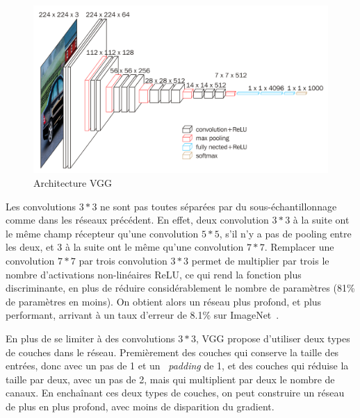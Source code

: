 \begin{figure}%
\includegraphics[width=\columnwidth]{figures/vgg.png}%
\caption{Architecture VGG~\cite{simonyan2014very}}%
\label{fig:vgg}%
\end{figure}

Les convolutions $3*3$ ne sont pas toutes séparées par du sous-échantillonnage comme dans les réseaux précédent.
En effet, deux convolution $3*3$ à la suite ont le même champ récepteur qu'une convolution $5*5$, s'il n'y a pas de pooling entre les deux, et 3 à la suite ont le même qu'une convolution $7*7$.
Remplacer une convolution $7*7$ par trois convolution $3*3$ permet de multiplier par trois le nombre d'activations non-linéaires ReLU, ce qui rend la fonction plus discriminante, en plus de réduire considérablement le nombre de paramètres (81\% de paramètres en moins).
On obtient alors un réseau plus profond, et plus performant, arrivant à un taux d'erreur de 8.1\% sur ImageNet~\cite{simonyan2014very}.

En plus de se limiter à des convolutions $3*3$, VGG propose d'utiliser deux types de couches dans le réseau.
Premièrement des couches qui conserve la taille des entrées, donc avec un pas de 1 et un ~\textit{padding} de 1, et des couches qui réduise la taille par deux, avec un pas de 2, mais qui multiplient par deux le nombre de canaux.
En enchaînant ces deux types de couches, on peut construire un réseau de plus en plus profond, avec moins de disparition du gradient.
 

